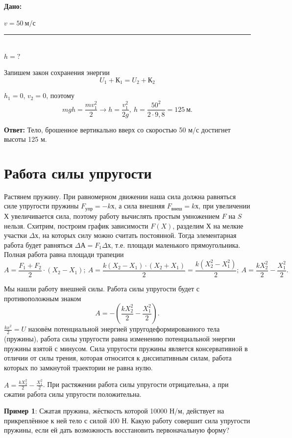 \documentclass[a5paper, 10pt]{diss_4}
\renewcommand{\'}{\,'}
\begin{document}
\hspace{1cm}\textbf{Дано:}\hspace{.3cm}
\parbox[t]{4cm}{
$v= 50\ м/с$\\
\rule{4cm}{.4pt}\\
$h = ?$\\
}

Запишем закон сохранения энергии
\[
U_1+К_1=U_2+К_2
\]

$h_1=0$,   $v_2=0$, поэтому
\[
mgh=\frac{mv^2_1}{2}\to
h=\frac{v^2_1}{2g},\
h=\frac{50^2}{2\cdot9,8}=125\ м.
\]

\textbf{Ответ:} Тело, брошенное вертикально вверх со скоростью 50 м/с достигнет высоты 125 м.

\section{Работа силы упругости}

Растянем пружину. При равномерном движении наша сила должна равняться силе упругости пружины $F_{упр}=-kх$, а сила внешняя $F_{внеш} = kх$, при увеличении $Х$ увеличивается сила, поэтому работу вычислять простым умножением $F$ на $S$ нельзя. Схитрим, построим график зависимости $F(X)$, разделим $Х$ на мелкие участки $\Delta х$, на которых силу можно считать постоянной. Тогда элементарная работа будет равняться $\Delta А=F_1\Delta х$, т.е. площади маленького прямоугольника. Полная работа равна площади трапеции
\[
A=\frac{F_1+F_2}{2}\cdot (X_2-X_1);\ A=\frac{k(X_2-X_1)\cdot(X_2+X_1)}{2}=\frac{k(X_2^2-X_1^2)}{2};\
A=\frac{kX_2^2}{2}-\frac{X_1^2}{2}.
\]

Мы нашли работу внешней силы. Работа силы упругости будет с противоположным знаком
\[
A=-(\frac{kX_2^2}{2}-\frac{X_1^2}{2}).
\]
$\frac{kx^2}{2}=U$ назовём потенциальной энергией упругодеформированного тела (пружины), работа силы упругости равна изменению потенциальной энергии пружины взятой с минусом. Сила упругости пружины является консервативной в отличии от силы трения, которая относится к диссипативным силам, работа которых по замкнутой траектории не равна нулю.

$A=\frac{kX_2^2}{2}-\frac{X_1^2}{2}$. При растяжении работа силы упругости отрицательна, а при сжатии работа силы упругости положительна.

\textbf{Пример 1}: Сжатая пружина, жёсткость которой 10000 Н/м, действует на прикреплённое к ней тело с силой 400 Н. Какую работу совершит сила упругости пружины, если ей дать возможность восстановить первоначальную форму?
\end{document}
